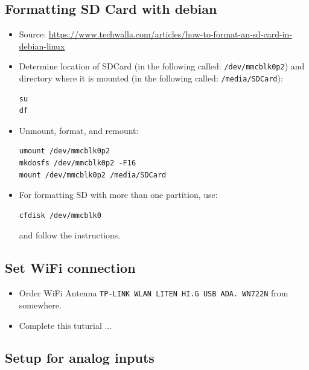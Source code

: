 \documentclass[
	fontsize=10pt
	paper=a4
]{scrartcl}
\begin{document}
\subsection{Formatting SD Card with debian}

\begin{itemize}
\item Source: \url{https://www.techwalla.com/articles/how-to-format-an-sd-card-in-debian-linux}

\item Determine location of SDCard (in the following called: \texttt{/dev/mmcblk0p2}) and directory where it is mounted (in the following called: \texttt{/media/SDCard}):
\begin{lstlisting}
su
df
\end{lstlisting}

\item Unmount, format, and remount:
\begin{lstlisting}
umount /dev/mmcblk0p2
mkdosfs /dev/mmcblk0p2 -F16
mount /dev/mmcblk0p2 /media/SDCard
\end{lstlisting}

\item For formatting SD with more than one partition, use:
\begin{lstlisting}
cfdisk /dev/mmcblk0
\end{lstlisting}
and follow the instructions.
\end{itemize}



\subsection{Set WiFi connection}

\begin{itemize}

\item Order WiFi Antenna \texttt{TP-LINK WLAN LITEN HI.G USB ADA. WN722N} from somewhere.

\item Complete this tuturial ...

\end{itemize}



\subsection{Setup for analog inputs}
\end{document}
